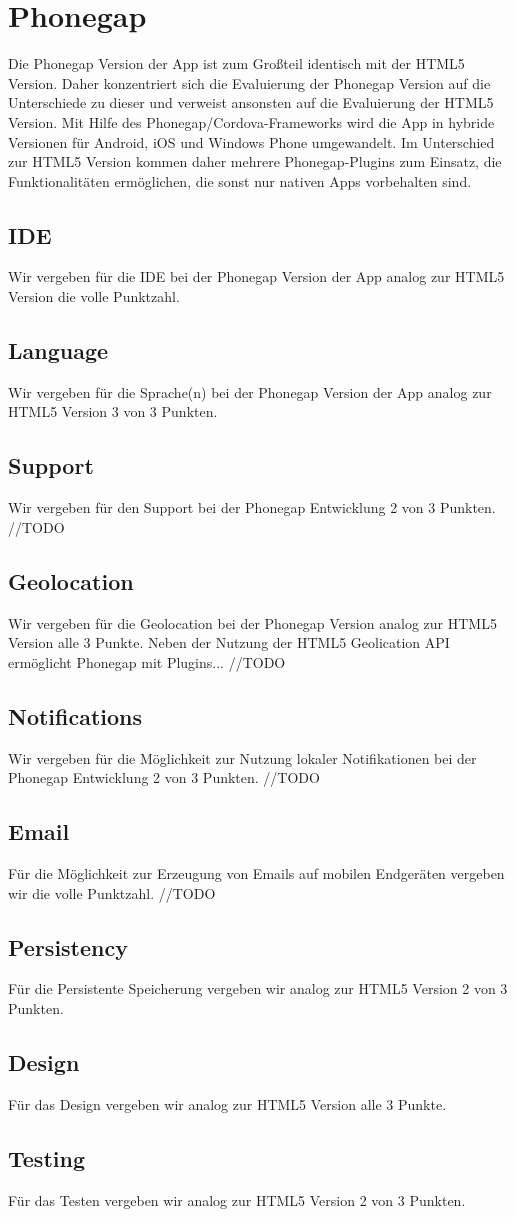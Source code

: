 \section{Phonegap}
Die Phonegap Version der App ist zum Großteil identisch mit der HTML5 Version. Daher konzentriert sich die Evaluierung der Phonegap Version auf die Unterschiede zu dieser und verweist ansonsten auf die Evaluierung der HTML5 Version. Mit Hilfe des Phonegap/Cordova-Frameworks wird die App in hybride Versionen für Android, iOS und Windows Phone umgewandelt. Im Unterschied zur HTML5 Version kommen daher mehrere Phonegap-Plugins zum Einsatz, die Funktionalitäten ermöglichen, die sonst nur nativen Apps vorbehalten sind.

\subsection{IDE}
Wir vergeben für die IDE bei der Phonegap Version der App analog zur HTML5 Version die volle Punktzahl.

\subsection{Language}
Wir vergeben für die Sprache(n) bei der Phonegap Version der App analog zur HTML5 Version 3 von 3 Punkten.

\subsection{Support}
Wir vergeben für den Support bei der Phonegap Entwicklung 2 von 3 Punkten. //TODO

\subsection{Geolocation}
Wir vergeben für die Geolocation bei der Phonegap Version analog zur HTML5 Version alle 3 Punkte. Neben der Nutzung der HTML5 Geolication API ermöglicht Phonegap mit Plugins... //TODO

\subsection{Notifications}
Wir vergeben für die Möglichkeit zur Nutzung lokaler Notifikationen bei der Phonegap Entwicklung 2 von 3 Punkten. //TODO

\subsection{Email}
Für die Möglichkeit zur Erzeugung von Emails auf mobilen Endgeräten vergeben wir die volle Punktzahl. //TODO

\subsection{Persistency}
Für die Persistente Speicherung vergeben wir analog zur HTML5 Version 2 von 3 Punkten.

\subsection{Design}
Für das Design vergeben wir analog zur HTML5 Version alle 3 Punkte.

\subsection{Testing}
Für das Testen vergeben wir analog zur HTML5 Version 2 von 3 Punkten.
